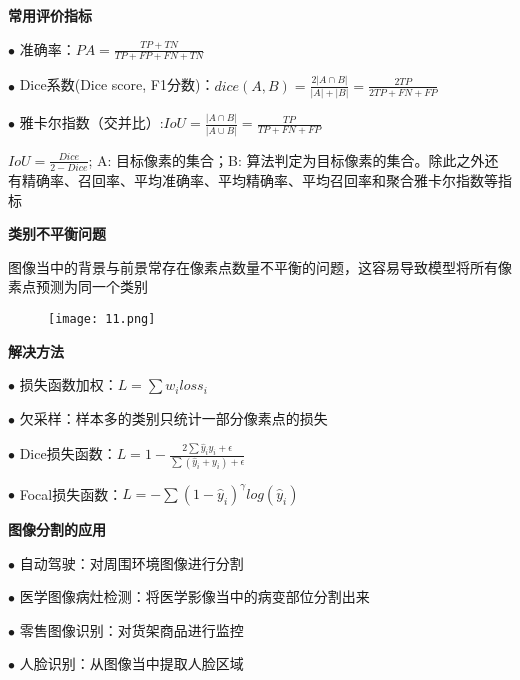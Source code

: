 \begin{frame}
    \noindent\large\textbf{常用评价指标}

    \vspace{0.1em}
    $\bullet$ 准确率：$PA=\frac{TP+TN}{TP+FP+FN+TN}$

    \vspace{0.1em}
    $\bullet$ Dice系数(Dice score, F1分数)：$dice(A,B)=\frac{2|A\cap B|}{|A|+|B|}=\frac{2TP}{2TP+FN+FP}$

    \vspace{0.1em}
    $\bullet$ 雅卡尔指数（交并比）:$IoU=\frac{|A\cap B|}{|A \cup B|} = \frac{TP}{TP + FN + FP}$

    \vspace{0.1em}
    $IoU= \frac{Dice}{2-Dice}$; A: 目标像素的集合；B: 算法判定为目标像素的集合。除此之外还有精确率、召回率、平均准确率、平均精确率、平均召回率和聚合雅卡尔指数等指标

    \begin{figure}
    \end{figure}

\end{frame}

\begin{frame}
    \noindent\large\textbf{类别不平衡问题}

    \vspace{1em}
    图像当中的背景与前景常存在像素点数量不平衡的问题，这容易导致模型将所有像素点预测为同一个类别
    \begin{figure}
        \texttt{[image: 11.png]}
    \end{figure}
\end{frame}

\begin{frame}
    \noindent\large\textbf{解决方法}

    \vspace{1em}
    $\bullet$ 损失函数加权：$L=\sum w_iloss_i$

    \vspace{1em}
    $\bullet$ 欠采样：样本多的类别只统计一部分像素点的损失

    \vspace{1em}
    $\bullet$ Dice损失函数：$L=1-\frac{2\sum \hat{y}_iy_i+\epsilon}{\sum (\hat{y}_i+y_i)+\epsilon}$

    \vspace{1em}
    $\bullet$ Focal损失函数：$L=-\sum (1-\hat{y}_i)^\gamma log(\hat{y}_i)$


\end{frame}

\begin{frame}
    \noindent\large\textbf{图像分割的应用}

    \vspace{1em}
    $\bullet$ 自动驾驶：对周围环境图像进行分割

    \vspace{1em}
    $\bullet$ 医学图像病灶检测：将医学影像当中的病变部位分割出来

    \vspace{1em}
    $\bullet$ 零售图像识别：对货架商品进行监控

    \vspace{1em}
    $\bullet$ 人脸识别：从图像当中提取人脸区域
\end{frame}

